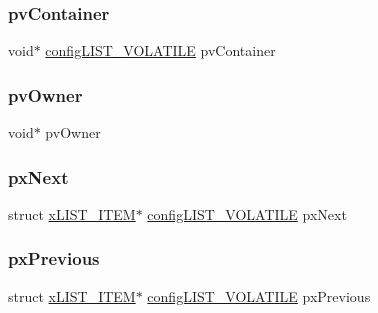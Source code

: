 \subsubsection{\texorpdfstring{pvContainer}{pvContainer}}
{\footnotesize\ttfamily void$\ast$ \mbox{\hyperlink{list_8h_a2d5de557c5561c8980d1bf51d87d8cba}{config\+L\+I\+S\+T\+\_\+\+V\+O\+L\+A\+T\+I\+LE}} pv\+Container}

\mbox{\label{structx_l_i_s_t___i_t_e_m_aeb54d184fbcccb5748e66cb2426e3b3f}} 
\subsubsection{\texorpdfstring{pvOwner}{pvOwner}}
{\footnotesize\ttfamily void$\ast$ pv\+Owner}

\mbox{\label{structx_l_i_s_t___i_t_e_m_a77927cd93dda0c59b3855aca58881ca1}} 
\subsubsection{\texorpdfstring{pxNext}{pxNext}}
{\footnotesize\ttfamily struct \mbox{\hyperlink{structx_l_i_s_t___i_t_e_m}{x\+L\+I\+S\+T\+\_\+\+I\+T\+EM}}$\ast$ \mbox{\hyperlink{list_8h_a2d5de557c5561c8980d1bf51d87d8cba}{config\+L\+I\+S\+T\+\_\+\+V\+O\+L\+A\+T\+I\+LE}} px\+Next}

\mbox{\label{structx_l_i_s_t___i_t_e_m_a0294e93ecc18bcdb723038af1027505d}} 
\subsubsection{\texorpdfstring{pxPrevious}{pxPrevious}}
{\footnotesize\ttfamily struct \mbox{\hyperlink{structx_l_i_s_t___i_t_e_m}{x\+L\+I\+S\+T\+\_\+\+I\+T\+EM}}$\ast$ \mbox{\hyperlink{list_8h_a2d5de557c5561c8980d1bf51d87d8cba}{config\+L\+I\+S\+T\+\_\+\+V\+O\+L\+A\+T\+I\+LE}} px\+Previous}

\mbox{\label{structx_l_i_s_t___i_t_e_m_aa6f3caf3e73107fb0da6fede4b06f104}} 
